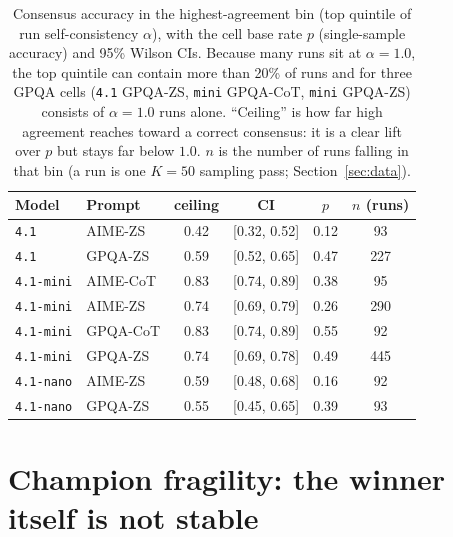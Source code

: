 \documentclass[a4paper,fleqn]{cas-sc}
\begin{document}
\begin{table}[t]\begin{minipage}{\linewidth}
\centering
\caption{Consensus accuracy in the highest-agreement bin (top quintile
of run self-consistency $\alpha$), with the cell
base rate $p$ (single-sample accuracy) and 95\% Wilson CIs. Because many
runs sit at $\alpha=1.0$, the top quintile can contain more than 20\% of
runs and for three GPQA cells (\texttt{4.1} GPQA-ZS, \texttt{mini} GPQA-CoT, \texttt{mini} GPQA-ZS) consists of $\alpha=1.0$ runs alone.
``Ceiling'' is how far high agreement reaches toward a correct consensus: it is a clear lift over
$p$ but stays far below $1.0$. $n$ is the number of runs
falling in that bin (a run is one $K=50$ sampling pass;
Section~\ref{sec:data}).}
\label{tab:ceiling}
\begin{tabular}{llcccc}
\toprule
Model & Prompt & ceiling & CI & $p$ & $n$ (runs) \\
\midrule
\texttt{4.1} & AIME-ZS & 0.42 & [0.32, 0.52] & 0.12 & 93 \\
\texttt{4.1} & GPQA-ZS & 0.59 & [0.52, 0.65] & 0.47 & 227 \\
\texttt{4.1-mini} & AIME-CoT & 0.83 & [0.74, 0.89] & 0.38 & 95 \\
\texttt{4.1-mini} & AIME-ZS & 0.74 & [0.69, 0.79] & 0.26 & 290 \\
\texttt{4.1-mini} & GPQA-CoT & 0.83 & [0.74, 0.89] & 0.55 & 92 \\
\texttt{4.1-mini} & GPQA-ZS & 0.74 & [0.69, 0.78] & 0.49 & 445 \\
\texttt{4.1-nano} & AIME-ZS & 0.59 & [0.48, 0.68] & 0.16 & 92 \\
\texttt{4.1-nano} & GPQA-ZS & 0.55 & [0.45, 0.65] & 0.39 & 93 \\
\bottomrule
\end{tabular}
\end{minipage}\end{table}

\section{Champion fragility: the winner itself is not stable}
\label{app:fragility}
\end{document}
